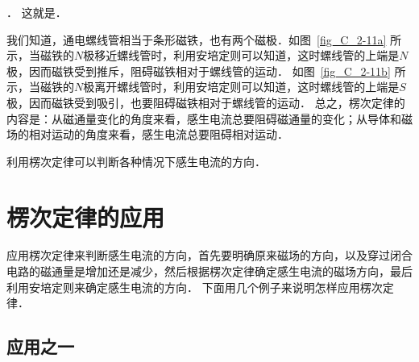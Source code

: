 ．
这就是．

我们知道，通电螺线管相当于条形磁铁，也有两个磁极．如图~\ref{fig_C_2-11a} 所示，当磁铁的$N$极移近螺线管时，利用安培定则可以知道，这时螺线管的上端是$N$极，因而磁铁受到推斥，阻碍磁铁相对于螺线管的运动．
如图~\ref{fig_C_2-11b} 所示，当磁铁的$N$极离开螺线管时，利用安培定则可以知道，这时螺线管的上端是$S$极，因而磁铁受到吸引，也要阻碍磁铁相对于螺线管的运动．
总之，楞次定律的内容是：从磁通量变化的角度来看，感生电流总要阻碍磁通量的变化；从导体和磁场的相对运动的角度来看，感生电流总要阻碍相对运动．

利用楞次定律可以判断各种情况下感生电流的方向．

\section{楞次定律的应用}
应用楞次定律来判断感生电流的方向，首先要明确原来磁场的方向，以及穿过闭合电路的磁通量是增加还是减少，然后根据楞次定律确定感生电流的磁场方向，最后利用安培定则来确定感生电流的方向．
下面用几个例子来说明怎样应用楞次定律．

\subsection*{应用之一}


